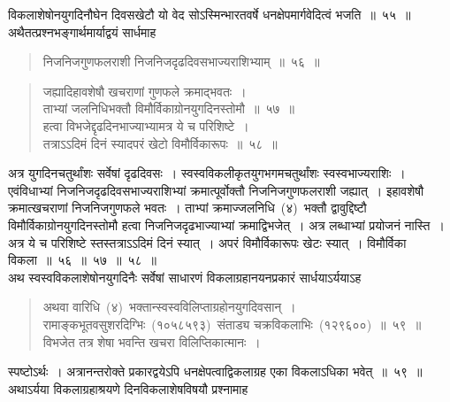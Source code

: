 \documentclass[11pt, openany]{book}
\begin{document}
\indent
विकलाशेषोनयुगदिनौघेन दिवसखेटौ यो वेद सोऽस्मिन्भारतवर्षे धनक्षेपमार्गवेदित्वं भजति~॥~५५~॥\\

\indent
अथैतत्प्रश्नभङ्गार्थमार्याद्वयं सार्धमाह\textendash

\begin{quote}
{\ks निजनिजगुणफलराशी निजनिजदृढदिवसभाज्यराशिभ्याम्~॥~५६~॥}
\end{quote}

\newpage
\thispagestyle{fancy}
\fancyhf{}

\begin{quote}
{\ks जह्यादिहावशेषौ खचराणां गुणफले क्रमाद्भवतः~।\\
ताभ्यां जलनिधिभक्तौ विमौर्विकाग्रोनयुगदिनस्तोमौ~॥~५७~॥\\
हत्वा विभजेद्दृढदिनभाज्याभ्यामत्र ये च परिशिष्टे~।\\
तत्राऽऽदिमं दिनं स्यादपरं खेटो विमौर्विकारूपः~॥~५८~॥}\\
\end{quote}

\indent
अत्र युगदिनचतुर्थांशः सर्वेषां दृढदिवसः~। स्वस्वविकलीकृतयुगभगमचतुर्थांशः स्वस्वभाज्यराशिः~। एवंविधाभ्यां निजनिजदृढदिवसभाज्यराशिभ्यां क्रमात्पूर्वोक्तौ निजनिजगुणफलराशी जह्यात्~। इहावशेषौ क्रमात्खचराणां निजनिजगुणफले भवतः~। ताभ्पां क्रमाज्जलनिधि~(४)~भक्तौ द्वावुद्दिष्टौ विमौर्विकाग्रोनयुगदिनस्तोमौ हत्वा निजनिजदृढभाज्याभ्यां क्रमाद्विभजेत्~। अत्र लब्धाभ्यां प्रयोजनं नास्ति~। अत्र ये च परिशिष्टे स्तस्तत्राऽऽदिमं दिनं स्यात्~। अपरं विमौर्विकारूपः खेटः स्यात्~। विमौर्विका विकला~॥~५६~॥~५७~॥~५८~॥\\

\indent
अथ स्वस्वविकलाशेषोनयुगदिनैः सर्वेषां साधारणं विकलाग्रहानयनप्रकारं सार्धयाऽर्ययाऽह\textendash

\begin{quote}
{\ks अथवा वारिधि~(४)~भक्तान्स्वस्वविलिप्ताग्रहोनयुगदिवसान्~।\\
रामाङ्कभूतवसुशरदिग्भिः~(१०५८५९३)~संताड्य चक्रविकलाभिः~(१२९६००)~॥~५९~॥\\
विभजेत तत्र शेषा भवन्ति खचरा विलिप्तिकात्मानः~।}
\end{quote}

\indent
स्पष्टोऽर्थः~। अत्रानन्तरोक्ते प्रकारद्वयेऽपि धनक्षेपत्वाद्विकलाग्रह एका विकलाऽधिका भवेत्~॥~५९~॥\\

\indent
अथाऽर्यया विकलाग्रहाश्रयणे दिनविकलाशेषविषयौ प्रश्नामाह\textendash
\end{document}
